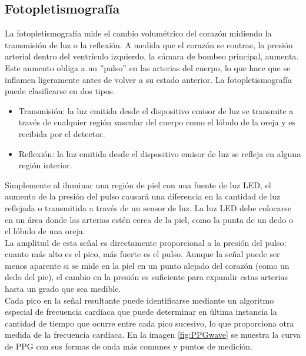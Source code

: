 		\subsection{Fotopletismografía}
			La fotopletismografía mide el cambio volumétrico del corazón midiendo la transmisión de luz o la reflexión. A medida que el corazón se contrae, la presión arterial dentro del ventrículo izquierdo, la cámara de bombeo principal, aumenta. Este aumento obliga a un ''pulso'' en las arterias del cuerpo, lo que hace que se inflamen ligeramente antes de volver a su estado anterior. La fotopletismografía puede clasificarse en dos tipos. \cite{agarwalHS}
			
			\begin{itemize}
				\item Transmisión: la luz emitida desde el dispositivo emisor de luz se transmite a través de cualquier región vascular del cuerpo como el lóbulo de la oreja y es recibida por el detector.
				\item Reflexión: la luz emitida desde el dispositivo emisor de luz se refleja en alguna región interior.
			\end{itemize}
			
			Simplemente al iluminar una región de piel con una fuente de luz LED, el aumento de la presión del pulso causará una diferencia en la cantidad de luz reflejada o transmitida a través de un sensor de luz. La luz LED debe colocarse en un área donde las arterias estén cerca de la piel, como la punta de un dedo o el lóbulo de una oreja. \\
			
			La amplitud de esta señal es directamente proporcional a la presión del pulso: cuanto más alto es el pico, más fuerte es el pulso. Aunque la señal puede ser menos aparente si se mide en la piel en un punto alejado del corazón (como un dedo del pie), el cambio en la presión es suficiente para expandir estas arterias hasta un grado que sea medible. \\
			
			Cada pico en la señal resultante puede identificarse mediante un algoritmo especial de frecuencia cardíaca que puede determinar en última instancia la cantidad de tiempo que ocurre entre cada pico sucesivo, lo que proporciona otra medida de la frecuencia cardíaca. En la imagen \ref{fig:PPGwave} se muestra la curva de PPG con sus formas de onda más comunes y puntos de medición. \\
		
